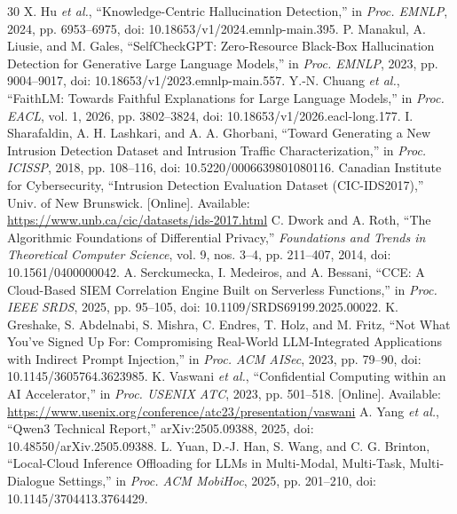\documentclass[conference,letterpaper]{IEEEtran}
\begin{document}
\begin{thebibliography}{30}
 X. Hu \emph{et al.}, ``Knowledge-Centric Hallucination Detection,'' in \emph{Proc. EMNLP}, 2024, pp. 6953--6975, doi: 10.18653/v1/2024.emnlp-main.395.
 P. Manakul, A. Liusie, and M. Gales, ``SelfCheckGPT: Zero-Resource Black-Box Hallucination Detection for Generative Large Language Models,'' in \emph{Proc. EMNLP}, 2023, pp. 9004--9017, doi: 10.18653/v1/2023.emnlp-main.557.
 Y.-N. Chuang \emph{et al.}, ``FaithLM: Towards Faithful Explanations for Large Language Models,'' in \emph{Proc. EACL}, vol. 1, 2026, pp. 3802--3824, doi: 10.18653/v1/2026.eacl-long.177.
 I. Sharafaldin, A. H. Lashkari, and A. A. Ghorbani, ``Toward Generating a New Intrusion Detection Dataset and Intrusion Traffic Characterization,'' in \emph{Proc. ICISSP}, 2018, pp. 108--116, doi: 10.5220/0006639801080116.
 Canadian Institute for Cybersecurity, ``Intrusion Detection Evaluation Dataset (CIC-IDS2017),'' Univ. of New Brunswick. [Online]. Available: \url{https://www.unb.ca/cic/datasets/ids-2017.html}
 C. Dwork and A. Roth, ``The Algorithmic Foundations of Differential Privacy,'' \emph{Foundations and Trends in Theoretical Computer Science}, vol. 9, nos. 3--4, pp. 211--407, 2014, doi: 10.1561/0400000042.
 A. Serckumecka, I. Medeiros, and A. Bessani, ``CCE: A Cloud-Based SIEM Correlation Engine Built on Serverless Functions,'' in \emph{Proc. IEEE SRDS}, 2025, pp. 95--105, doi: 10.1109/SRDS69199.2025.00022.
 K. Greshake, S. Abdelnabi, S. Mishra, C. Endres, T. Holz, and M. Fritz, ``Not What You've Signed Up For: Compromising Real-World LLM-Integrated Applications with Indirect Prompt Injection,'' in \emph{Proc. ACM AISec}, 2023, pp. 79--90, doi: 10.1145/3605764.3623985.
 K. Vaswani \emph{et al.}, ``Confidential Computing within an AI Accelerator,'' in \emph{Proc. USENIX ATC}, 2023, pp. 501--518. [Online]. Available: \url{https://www.usenix.org/conference/atc23/presentation/vaswani}
 A. Yang \emph{et al.}, ``Qwen3 Technical Report,'' arXiv:2505.09388, 2025, doi: 10.48550/arXiv.2505.09388.
 L. Yuan, D.-J. Han, S. Wang, and C. G. Brinton, ``Local-Cloud Inference Offloading for LLMs in Multi-Modal, Multi-Task, Multi-Dialogue Settings,'' in \emph{Proc. ACM MobiHoc}, 2025, pp. 201--210, doi: 10.1145/3704413.3764429.
\end{thebibliography}
\end{document}
